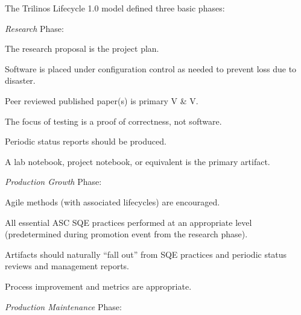 \documentclass[11pt]{SANDreport}
\begin{document}
The Trilinos Lifecycle 1.0 model defined three basic phases:

\begin{compactitem}

{}\item\textit{Research} Phase:

  \begin{compactitem}

  {}\item The research proposal is the project plan.

  {}\item Software is placed under configuration control as needed to
  prevent loss due to disaster.

  {}\item Peer reviewed published paper(s) is primary V \& V.

  {}\item The focus of testing is a proof of correctness, not
  software.

  {}\item Periodic status reports should be produced.

  {}\item A lab notebook, project notebook, or equivalent is the   primary artifact.
  
  \end{compactitem}

{}\item\textit{Production Growth} Phase:

  \begin{compactitem}

  {}\item Agile methods (with associated lifecycles) are encouraged.

  {}\item All essential ASC SQE practices performed at an appropriate   level (predetermined during promotion event from the research   phase).

  {}\item Artifacts should naturally ``fall out'' from SQE practices   and periodic status reviews and management reports.

  {}\item Process improvement and metrics are appropriate.
  
  \end{compactitem}

{}\item\textit{Production Maintenance} Phase:


\end{compactitem}
\end{document}
